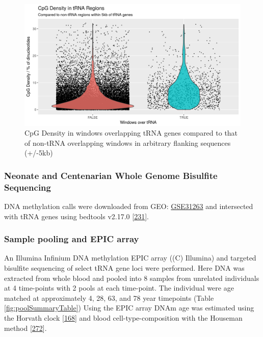 \documentclass[
]{book}
\begin{document}
\begin{figure}

{\centering \includegraphics[width=1\linewidth]{figs/CpGcountBGvstRNAPlot} 

}

\caption{CpG Density in windows overlapping tRNA genes compared to that of non-tRNA overlapping windows in arbitrary flanking sequences (+/-5kb)}\label{fig:CpGcountBGvstRNAPlot}
\end{figure}



\hypertarget{neonate-and-centenarian-whole-genome-bisulfite-sequencing}{%
\subsubsection{Neonate and Centenarian Whole Genome Bisulfite Sequencing}\label{neonate-and-centenarian-whole-genome-bisulfite-sequencing}}

DNA methylation calls were downloaded from GEO: \href{https://www.ncbi.nlm.nih.gov/geo/query/acc.cgi?acc=GSE31263}{GSE31263} and intersected with tRNA genes using bedtools v2.17.0 {[}\protect\hyperlink{ref-Quinlan2010}{231}{]}.

\hypertarget{sample-pooling-and-epic-array}{%
\subsubsection{Sample pooling and EPIC array}\label{sample-pooling-and-epic-array}}

An Illumina Infinium DNA methylation EPIC array ((C) Illumina) and targeted bisulfite sequencing of select tRNA gene loci were performed.
Here DNA was extracted from whole blood and pooled into 8 samples from unrelated individuals at 4 time-points with 2 pools at each time-point.
The individual were age matched at approximately 4, 28, 63, and 78 year timepoints (Table \ref{fig:poolSummaryTable})
Using the EPIC array DNAm age was estimated using the Horvath clock {[}\protect\hyperlink{ref-Horvath2013}{168}{]} and blood cell-type-composition with the Houseman method {[}\protect\hyperlink{ref-Houseman2012}{272}{]}.
\end{document}
